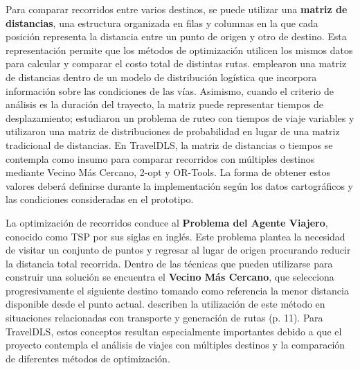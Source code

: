 Para comparar recorridos entre varios destinos, se puede utilizar una \hypertarget{concepto-matriz}{\textbf{matriz de distancias}}, una estructura organizada en filas y columnas en la que cada posición representa la distancia entre un punto de origen y otro de destino. Esta representación permite que los métodos de optimización utilicen los mismos datos para calcular y comparar el costo total de distintas rutas. \textcite{tuo2024matrix} emplearon una matriz de distancias dentro de un modelo de distribución logística que incorpora información sobre las condiciones de las vías. Asimismo, cuando el criterio de análisis es la duración del trayecto, la matriz puede representar tiempos de desplazamiento; \textcite{lombard2018matrix} estudiaron un problema de ruteo con tiempos de viaje variables y utilizaron una matriz de distribuciones de probabilidad en lugar de una matriz tradicional de distancias. En TravelDLS, la matriz de distancias o tiempos se contempla como insumo para comparar recorridos con múltiples destinos mediante Vecino Más Cercano, 2-opt y OR-Tools. La forma de obtener estos valores deberá definirse durante la implementación según los datos cartográficos y las condiciones consideradas en el prototipo.

La optimización de recorridos conduce al \hypertarget{concepto-tsp}{\textbf{Problema del Agente Viajero}}, conocido como TSP por sus siglas en inglés. Este problema plantea la necesidad de visitar un conjunto de puntos y regresar al lugar de origen procurando reducir la distancia total recorrida. Dentro de las técnicas que pueden utilizarse para construir una solución se encuentra el \hypertarget{concepto-vecino-mas-cercano}{\textbf{Vecino Más Cercano}}, que selecciona progresivamente el siguiente destino tomando como referencia la menor distancia disponible desde el punto actual. \textcite{contreras2021aplicacion} describen la utilización de este método en situaciones relacionadas con transporte y generación de rutas (p. 11). Para TravelDLS, estos conceptos resultan especialmente importantes debido a que el proyecto contempla el análisis de viajes con múltiples destinos y la comparación de diferentes métodos de optimización.


